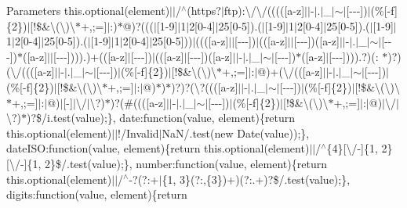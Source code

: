 {\begin{DoxyParams}{Parameters}
this.\+optional(element)$\vert$$\vert$/$^\wedge$(https?$\vert$ftp)\+:\textbackslash{}/\textbackslash{}/((((\mbox{[}a-\/z\mbox{]}$\vert$$\vert$-\/$\vert$.$\vert$\+\_\+$\vert$$\sim$$\vert$\mbox{[}-\/-\/-\/\mbox{]})$\vert$(\%\mbox{[}-\/f\mbox{]}\{2\})$\vert$\mbox{[}!\$\&\textquotesingle{}\textbackslash{}(\textbackslash{})\textbackslash{}$\ast$+,;=\mbox{]}$\vert$\+:)$\ast$@)?((($\vert$\mbox{[}1-\/9\mbox{]}$\vert$1$\vert$2\mbox{[}0-\/4\mbox{]}$\vert$25\mbox{[}0-\/5\mbox{]}).($\vert$\mbox{[}1-\/9\mbox{]}$\vert$1$\vert$2\mbox{[}0-\/4\mbox{]}$\vert$25\mbox{[}0-\/5\mbox{]}).($\vert$\mbox{[}1-\/9\mbox{]}$\vert$1$\vert$2\mbox{[}0-\/4\mbox{]}$\vert$25\mbox{[}0-\/5\mbox{]}).($\vert$\mbox{[}1-\/9\mbox{]}$\vert$1$\vert$2\mbox{[}0-\/4\mbox{]}$\vert$25\mbox{[}0-\/5\mbox{]}))$\vert$(((\mbox{[}a-\/z\mbox{]}$\vert$$\vert$\mbox{[}-\/-\/-\/\mbox{]})$\vert$((\mbox{[}a-\/z\mbox{]}$\vert$$\vert$\mbox{[}-\/-\/-\/\mbox{]})(\mbox{[}a-\/z\mbox{]}$\vert$$\vert$-\/$\vert$.$\vert$\+\_\+$\vert$$\sim$$\vert$\mbox{[}-\/-\/-\/\mbox{]})$\ast$(\mbox{[}a-\/z\mbox{]}$\vert$$\vert$\mbox{[}-\/-\/-\/\mbox{]}))).)+((\mbox{[}a-\/z\mbox{]}$\vert$\mbox{[}-\/-\/-\/\mbox{]})$\vert$((\mbox{[}a-\/z\mbox{]}$\vert$\mbox{[}-\/-\/-\/\mbox{]})(\mbox{[}a-\/z\mbox{]}$\vert$$\vert$-\/$\vert$.$\vert$\+\_\+$\vert$$\sim$$\vert$\mbox{[}-\/-\/-\/\mbox{]})$\ast$(\mbox{[}a-\/z\mbox{]}$\vert$\mbox{[}-\/-\/-\/\mbox{]}))).?)(\+: $\ast$)?)(\textbackslash{}/(((\mbox{[}a-\/z\mbox{]}$\vert$$\vert$-\/$\vert$.$\vert$\+\_\+$\vert$$\sim$$\vert$\mbox{[}-\/-\/-\/\mbox{]})$\vert$(\%\mbox{[}-\/f\mbox{]}\{2\})$\vert$\mbox{[}!\$\&\textquotesingle{}\textbackslash{}(\textbackslash{})\textbackslash{}$\ast$+,;=\mbox{]}$\vert$\+:$\vert$@)+(\textbackslash{}/((\mbox{[}a-\/z\mbox{]}$\vert$$\vert$-\/$\vert$.$\vert$\+\_\+$\vert$$\sim$$\vert$\mbox{[}-\/-\/-\/\mbox{]})$\vert$(\%\mbox{[}-\/f\mbox{]}\{2\})$\vert$\mbox{[}!\$\&\textquotesingle{}\textbackslash{}(\textbackslash{})\textbackslash{}$\ast$+,;=\mbox{]}$\vert$\+:$\vert$@)$\ast$)$\ast$)?)?(\textbackslash{}?(((\mbox{[}a-\/z\mbox{]}$\vert$$\vert$-\/$\vert$.$\vert$\+\_\+$\vert$$\sim$$\vert$\mbox{[}-\/-\/-\/\mbox{]})$\vert$(\%\mbox{[}-\/f\mbox{]}\{2\})$\vert$\mbox{[}!\$\&\textquotesingle{}\textbackslash{}(\textbackslash{})\textbackslash{}$\ast$+,;=\mbox{]}$\vert$\+:$\vert$@)$\vert$\mbox{[}-\/\mbox{]}$\vert$\textbackslash{}/$\vert$\textbackslash{}?)$\ast$)?(\#(((\mbox{[}a-\/z\mbox{]}$\vert$$\vert$-\/$\vert$.$\vert$\+\_\+$\vert$$\sim$$\vert$\mbox{[}-\/-\/-\/\mbox{]})$\vert$(\%\mbox{[}-\/f\mbox{]}\{2\})$\vert$\mbox{[}!\$\&\textquotesingle{}\textbackslash{}(\textbackslash{})\textbackslash{}$\ast$+,;=\mbox{]}$\vert$\+:$\vert$@)$\vert$\textbackslash{}/$\vert$\textbackslash{}?)$\ast$)?\$/i.test(value);\}, date\+:function(value, element)\{return this.\+optional(element)$\vert$$\vert$!/\+Invalid$\vert$\+Na\+N/.test(new Date(value));\}, date\+I\+SO\+:function(value, element)\{return this.\+optional(element)$\vert$$\vert$/$^\wedge$\{4\}\mbox{[}\textbackslash{}/-\/\mbox{]}\{1, 2\}\mbox{[}\textbackslash{}/-\/\mbox{]}\{1, 2\}\$/.test(value);\}, number\+:function(value, element)\{return this.\+optional(element)$\vert$$\vert$/$^\wedge$-\/?(?\+:+$\vert$\{1, 3\}(?\+:,\{3\})+)(?\+:.+)?\$/.test(value);\}, digits\+:function(value, element)\{return 
\end{DoxyParams}}

